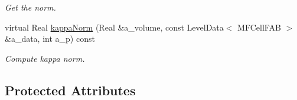 \begin{DoxyCompactItemize}
\begin{DoxyCompactList}\small\item\em Get the norm. \end{DoxyCompactList}\item 
virtual Real \hyperlink{classmfconductivityop_a57cc17044dc6bb70479230ca1cc51452}{kappa\+Norm} (Real \&a\+\_\+volume, const Level\+Data$<$ M\+F\+Cell\+F\+AB $>$ \&a\+\_\+data, int a\+\_\+p) const 
\begin{DoxyCompactList}\small\item\em Compute kappa norm. \end{DoxyCompactList}\end{DoxyCompactItemize}
\subsection*{Protected Attributes}
